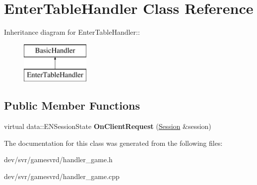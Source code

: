 \hypertarget{classEnterTableHandler}{
\section{EnterTableHandler Class Reference}
\label{classEnterTableHandler}
}
Inheritance diagram for EnterTableHandler::\begin{figure}[H]
\begin{center}
\leavevmode
\includegraphics[height=2cm]{classEnterTableHandler}
\end{center}
\end{figure}
\subsection*{Public Member Functions}
\begin{DoxyCompactItemize}
\item 
\hypertarget{classEnterTableHandler_a8303b93cb247074cfa8eb0882b45e41d}{
virtual data::ENSessionState {\bfseries OnClientRequest} (\hyperlink{classSession}{Session} \&session)}
\label{classEnterTableHandler_a8303b93cb247074cfa8eb0882b45e41d}

\end{DoxyCompactItemize}


The documentation for this class was generated from the following files:\begin{DoxyCompactItemize}
\item 
dev/svr/gamesvrd/handler\_\-game.h\item 
dev/svr/gamesvrd/handler\_\-game.cpp\end{DoxyCompactItemize}
